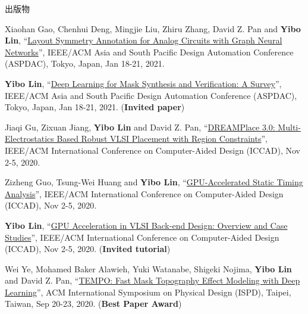 \begin{rSection}{出版物}
\begin{description}[font=\normalfont, rightmargin=2em]
{}
            

\item[{[C44]}]{
        Xiaohan Gao, Chenhui Deng, Mingjie Liu, Zhiru Zhang, David Z. Pan and \textbf{Yibo Lin}, 
    ``\href{https://doi.org/10.1145/3394885.3431545}{Layout Symmetry Annotation for Analog Circuits with Graph Neural Networks}'', 
    IEEE/ACM Asia and South Pacific Design Automation Conference (ASPDAC), Tokyo, Japan, Jan 18-21, 2021.
    
}
            

\item[{[C43]}]{
        \textbf{Yibo Lin}, 
    ``\href{https://doi.org/10.1145/3394885.3431624}{Deep Learning for Mask Synthesis and Verification: A Survey}'', 
    IEEE/ACM Asia and South Pacific Design Automation Conference (ASPDAC), Tokyo, Japan, Jan 18-21, 2021.
    (\textbf{Invited paper})
}
            

\item[{[C42]}]{
        Jiaqi Gu, Zixuan Jiang, \textbf{Yibo Lin} and David Z. Pan, 
    ``\href{https://doi.org/10.1145/3400302.3415691}{DREAMPlace 3.0: Multi-Electrostatics Based Robust VLSI Placement with Region Constraints}'', 
    IEEE/ACM International Conference on Computer-Aided Design (ICCAD), Nov 2-5, 2020.
    
}
            

\item[{[C41]}]{
        Zizheng Guo, Tsung-Wei Huang and \textbf{Yibo Lin}, 
    ``\href{https://doi.org/10.1145/3400302.3415631}{GPU-Accelerated Static Timing Analysis}'', 
    IEEE/ACM International Conference on Computer-Aided Design (ICCAD), Nov 2-5, 2020.
    
}
            

\item[{[C40]}]{
        \textbf{Yibo Lin}, 
    ``\href{https://doi.org/10.1145/3400302.3415765}{GPU Acceleration in VLSI Back-end Design: Overview and Case Studies}'', 
    IEEE/ACM International Conference on Computer-Aided Design (ICCAD), Nov 2-5, 2020.
    (\textbf{Invited tutorial})
}
            

\item[{[C39]}]{
        Wei Ye, Mohamed Baker Alawieh, Yuki Watanabe, Shigeki Nojima, \textbf{Yibo Lin} and David Z. Pan, 
    ``\href{https://doi.org/10.1145/3372780.3375565}{TEMPO: Fast Mask Topography Effect Modeling with Deep Learning}'', 
    ACM International Symposium on Physical Design (ISPD), Taipei, Taiwan, Sep 20-23, 2020.
    (\textbf{Best Paper Award})
}
            


\end{description}
\end{rSection}
